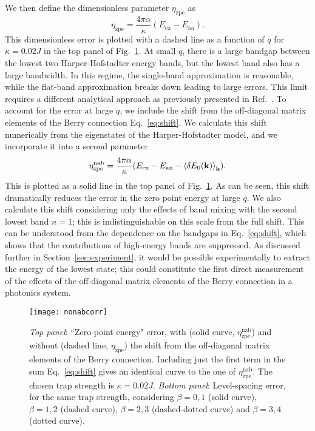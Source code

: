 We then define the dimensionless parameter $\eta_{\text{zpe}}$ as
\begin{equation} \eta_{\text{zpe}} = \frac{4\pi\alpha}{\kappa}
(E_{\text{ex}} -E_{\text{an}}).
\end{equation} This dimensionless error is plotted with a dashed line
as a function of $q$ for $\kappa=0.02 J$ in the top panel of
Fig.~\ref{fig:zpe}. At small $q$, there is a large bandgap between the
lowest two Harper-Hofstadter energy bands, but the lowest band also
has a large bandwidth. In this regime, the single-band approximation
is reasonable, while the flat-band approximation breaks down leading
to large errors. This limit requires a different analytical approach
as previously presented in Ref.~\cite{ozawa2014momhh}.  To account for
the error at large $q$, we include the shift from the off-diagonal
matrix elements of the Berry connection Eq.~\eqref{eq:shift}. We
calculate this shift numerically from the eigenstates of the
Harper-Hofstadter model, and we incorporate it into a second parameter
\begin{equation} \eta_{\text{zpe}}^{\text{nab}} =
\frac{4\pi\alpha}{\kappa}(E_{\text{ex}} - E_{\text{an}} - \left<\delta
E_0(\mathbf{k})\right>_{\mathbf{k}}).
\end{equation} This is plotted as a solid line in the top panel of
Fig.~\ref{fig:zpe}. As can be seen, this shift dramatically reduces
the error in the zero point energy at large $q$. We also calculate
this shift considering only the effects of band mixing with the second
lowest band $n=1$; this is indistinguishable on this scale from the
full shift. This can be understood from the dependence on the bandgaps
in Eq.~\eqref{eq:shift}, which shows that the contributions of
high-energy bands are suppressed. As discussed further in
Section~\ref{sec:experiment}, it would be possible experimentally to extract
the energy of the lowest state; this could constitute the first direct
measurement of the effects of the off-diagonal matrix elements of the
Berry connection in a photonics system.

\begin{figure}[tb]\centering
  \texttt{[image: nonabcorr]}
  \caption{\emph{Top panel}: ``Zero-point energy" error, with (solid
curve, $\eta_{\text{zpe}}^{\text{nab}}$) and without (dashed line,
$\eta_{\text{zpe}}$) the shift from the off-diagonal matrix elements
of the Berry connection. Including just the first term in the sum
Eq.~\eqref{eq:shift} gives an identical curve to the one of
$\eta_{\text{zpe}}^{\text{nab}}$. The chosen trap strength is $\kappa
= 0.02 J$.  \emph{Bottom panel}: Level-spacing error, for the same
trap strength, considering $\beta = 0,1$ (solid curve), $\beta = 1,2$
(dashed curve), $\beta = 2,3$ (dashed-dotted curve) and $\beta = 3,4$
(dotted curve).}
  \label{fig:zpe}
\end{figure}

